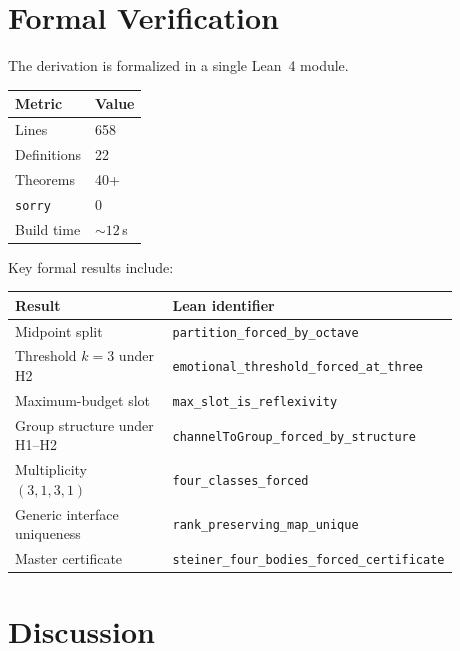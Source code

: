 \documentclass[11pt,a4paper]{article}
\theoremstyle{definition}
\newcommand{\code}[1]{\texttt{\small #1}}
\begin{document}
\section{Formal Verification}
\label{sec:formal}

The derivation is formalized in a single Lean~4 module.

\begin{center}
\small
\begin{tabular}{ll}
\toprule
\textbf{Metric} & \textbf{Value} \\
\midrule
Lines & 658 \\
Definitions & 22 \\
Theorems & 40+ \\
\texttt{sorry} & 0 \\
Build time & ${\sim}12\,$s \\
\bottomrule
\end{tabular}
\end{center}

Key formal results include:
\begin{center}
\small
\begin{tabular}{p{0.42\linewidth}p{0.46\linewidth}}
\toprule
\textbf{Result} & \textbf{Lean identifier} \\
\midrule
Midpoint split & \code{partition\_forced\_by\_octave} \\
Threshold $k=3$ under H2 & \code{emotional\_threshold\_forced\_at\_three} \\
Maximum-budget slot & \code{max\_slot\_is\_reflexivity} \\
Group structure under H1--H2 & \code{channelToGroup\_forced\_by\_structure} \\
Multiplicity $(3,1,3,1)$ & \code{four\_classes\_forced} \\
Generic interface uniqueness & \code{rank\_preserving\_map\_unique} \\
Master certificate & \code{steiner\_four\_bodies\_forced\_certificate} \\
\bottomrule
\end{tabular}
\end{center}

\section{Discussion}
\label{sec:discussion}
\end{document}
